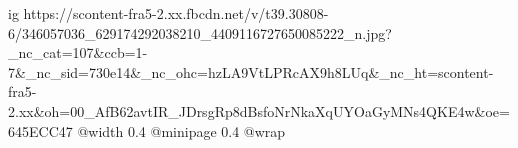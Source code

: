  
 
 
 
 


\ifcmt
  ig https://scontent-fra5-2.xx.fbcdn.net/v/t39.30808-6/346057036_629174292038210_4409116727650085222_n.jpg?_nc_cat=107&ccb=1-7&_nc_sid=730e14&_nc_ohc=hzLA9VtLPRcAX9h8LUq&_nc_ht=scontent-fra5-2.xx&oh=00_AfB62avtIR_JDrsgRp8dBsfoNrNkaXqUYOaGyMNs4QKE4w&oe=645ECC47
  @width 0.4
  @minipage 0.4
  @wrap \parpic[r]
\fi

